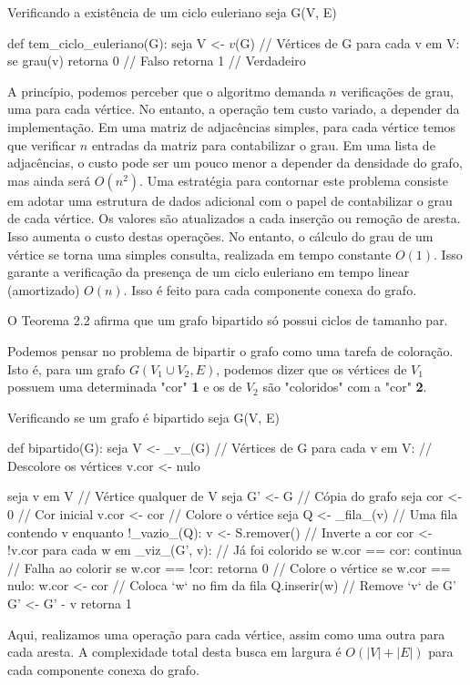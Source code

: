 \documentclass{homework}
\begin{document}
	\begin{algor}{Verificando a existência de um ciclo euleriano}
	seja G(V, E)
	
	def tem_ciclo_euleriano(G):
		seja V <- $v$(G) // Vértices de G
		para cada v em V:
			se grau(v) %
				retorna 0 // Falso
		retorna 1 // Verdadeiro
	\end{algor}
	A princípio, podemos perceber que o algoritmo demanda $n$ verificações de grau, uma para cada vértice. No entanto, a operação  tem custo variado, a depender da implementação. Em uma matriz de adjacências simples, para cada vértice temos que verificar $n$ entradas da matriz para contabilizar o grau. Em uma lista de adjacências, o custo pode ser um pouco menor a depender da densidade do grafo, mas ainda será $O(n^2)$. Uma estratégia para contornar este problema consiste em adotar uma estrutura de dados adicional com o papel de contabilizar o grau de cada vértice. Os valores são atualizados a cada inserção ou remoção de aresta. Isso aumenta o custo destas operações. No entanto, o cálculo do grau de um vértice se torna uma simples consulta, realizada em tempo constante $O(1)$. Isso garante a verificação da presença de um ciclo euleriano em tempo linear (amortizado) $O(n)$. Isso é feito para cada componente conexa do grafo.

	\quest
	O Teorema 2.2\cite{jayme:18} afirma que um grafo bipartido só possui ciclos de tamanho par.\par
	
	Podemos pensar no problema de bipartir o grafo como uma tarefa de coloração. Isto é, para um grafo $G(V_{1} \cup V_{2}, E)$, podemos dizer que os vértices de $V_{1}$ possuem uma determinada "cor" \textbf{\color{red} 1} e os de $V_{2}$ são "coloridos" com a "cor" \textbf{\color{blue} 2}.\par
	
	\begin{algor}{Verificando se um grafo é bipartido}
	seja G(V, E)
	
	def bipartido(G):
		seja V <- _v_(G) // Vértices de G
		para cada v em V: // Descolore os vértices
			v.cor <- nulo
		
		seja v em V       // Vértice qualquer de V
		seja G' <- G       // Cópia do grafo
		seja cor <- 0      // Cor inicial
		v.cor <- cor      // Colore o vértice
		seja Q <- _fila_({v}) // Uma fila contendo v
		enquanto !_vazio_(Q):
			v <- S.remover()
			// Inverte a cor
			cor <- !v.cor
			para cada w em _viz_(G', v):
				// Já foi colorido
				se w.cor == cor:
					continua
				// Falha ao colorir
				se w.cor == !cor:
					retorna 0
				// Colore o vértice
				se w.cor == nulo:
					w.cor <- cor
					// Coloca `w` no fim da fila
					Q.inserir(w)
			// Remove `v` de G'
			G' <- G' - v
		retorna 1
	\end{algor}
	Aqui, realizamos uma operação para cada vértice, assim como uma outra para cada aresta. A complexidade total desta busca em largura é $O(|V| + |E|)$ para cada componente conexa do grafo.
	
\end{document}
